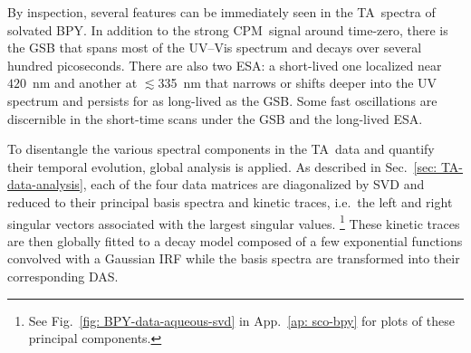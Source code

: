 By inspection, several features can be immediately seen in the TA~spectra of solvated BPY.
In addition to the strong CPM~signal around time-zero,
there is the GSB that spans most of the UV--Vis spectrum and decays over several hundred picoseconds.
%
There are also two ESA: a short-lived one localized near $420$~nm
and another at $\lesssim$335~nm that narrows or shifts deeper into the UV spectrum
and persists for as long-lived as the GSB.
%
Some fast oscillations are discernible in the short-time scans
under the GSB and the long-lived ESA.

To disentangle the various spectral components in the TA~data and quantify
their temporal evolution, global analysis is applied.
%
As described in Sec.~\ref{sec: TA-data-analysis},
each of the four data matrices are diagonalized by SVD and
reduced to their principal basis spectra and kinetic traces,
i.e.~the left and right singular vectors associated with the largest singular values.%
\footnote{See Fig.~\ref{fig: BPY-data-aqueous-svd} in App.~\ref{ap: sco-bpy}
for plots of these principal components.}
%
These kinetic traces are then globally fitted to a decay model composed of
a few exponential functions convolved with a Gaussian IRF
while the basis spectra are transformed into their corresponding DAS.

